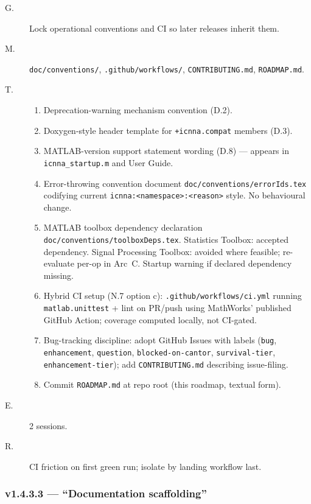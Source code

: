 \documentclass[11pt,a4paper]{article}
\begin{document}
\begin{description}
    \item[G.] Lock operational conventions and CI so later releases inherit them.
    \item[M.] \texttt{doc/conventions/}, \texttt{.github/workflows/}, \texttt{CONTRIBUTING.md}, \texttt{ROADMAP.md}.
    \item[T.]
        \begin{enumerate}[nosep]
            \item Deprecation-warning mechanism convention (D.2).
            \item Doxygen-style header template for \texttt{+icnna.compat} members (D.3).
            \item MATLAB-version support statement wording (D.8) --- appears in \texttt{icnna\_startup.m} and User Guide.
            \item Error-throwing convention document \texttt{doc/conventions/errorIds.tex} codifying current \texttt{icnna:<namespace>:<reason>} style. No behavioural change.
            \item MATLAB toolbox dependency declaration \texttt{doc/conventions/toolboxDeps.tex}. Statistics Toolbox: accepted dependency. Signal Processing Toolbox: avoided where feasible; re-evaluate per-op in Arc~C. Startup warning if declared dependency missing.
            \item Hybrid CI setup (N.7 option c): \texttt{.github/workflows/ci.yml} running \texttt{matlab.unittest} + lint on PR/push using MathWorks' published GitHub Action; coverage computed locally, not CI-gated.
            \item Bug-tracking discipline: adopt GitHub Issues with labels (\texttt{bug}, \texttt{enhancement}, \texttt{question}, \texttt{blocked-on-cantor}, \texttt{survival-tier}, \texttt{enhancement-tier}); add \texttt{CONTRIBUTING.md} describing issue-filing.
            \item Commit \texttt{ROADMAP.md} at repo root (this roadmap, textual form).
        \end{enumerate}
    \item[E.] 2 sessions.
    \item[R.] CI friction on first green run; isolate by landing workflow last.
\end{description}

\subsubsection*{v1.4.3.3 --- ``Documentation scaffolding''}
\end{document}
